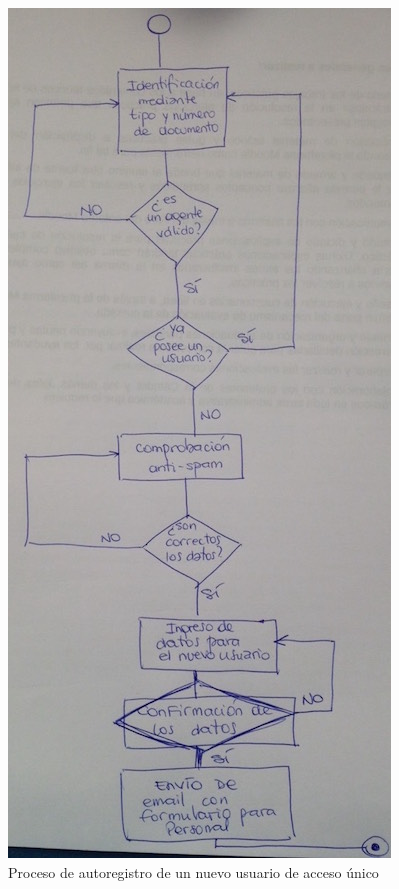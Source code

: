 \begin{figure}[H]
  \centering
  \includegraphics[width=\textwidth,height=0.5\textheight,keepaspectratio]{src/images/05-capitulo-5/diagrama-flujo-registro.jpg}
  \caption{Proceso de autoregistro de un nuevo usuario de acceso único}
  \label{fig:diagrama-flujo-registro}
\end{figure}

